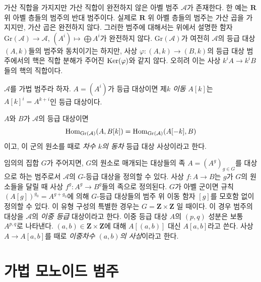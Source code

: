 \begin{remark}[주의]
\label{remark-direct-sums-not-exact}
가산 직합을 가지지만 가산 직합이 완전하지 않은 아벨 범주
$\mathcal{A}$가 존재한다. 한 예는 $\mathbf{R}$ 위 아벨 층들의 범주의
반대 범주이다. 실제로 $\mathbf{R}$ 위 아벨 층들의 범주는 가산 곱을
가지지만, 가산 곱은 완전하지 않다. 그러한 범주에 대해서는 위에서
설명한 함자 $\text{Gr}(\mathcal{A}) \to \mathcal{A}$,
$(A^i) \mapsto \bigoplus A^i$가 완전하지 않다.
$\text{Gr}(\mathcal{A})$가 여전히 $\mathcal{A}$의 등급 대상
$(A, k)$들의 범주와 동치이기는 하지만, 사상
$\varphi : (A, k) \to (B, k)$의 등급 대상 범주에서의 핵은 직합
분해가 주어진 $\mathop{\mathrm{Ker}}(\varphi)$와 같지 않다. 오히려 이는 사상
$k^iA \to k^iB$들의 핵의 직합이다.
\end{remark}

\begin{definition}
\label{definition-graded-shift}
$\mathcal{A}$를 가법 범주라 하자.
$A = (A^i)$가 등급 대상이면 제$k$ {\it 이동} $A[k]$는
$A[k]^i = A^{k + i}$인 등급 대상이다.
\end{definition}

\noindent
$A$와 $B$가 $\mathcal{A}$의 등급 대상이면
\begin{equation}
\label{equation-hom-into-shift}
\mathop{\mathrm{Hom}}\nolimits_{\text{Gr}(\mathcal{A})}(A, B[k]) =
\mathop{\mathrm{Hom}}\nolimits_{\text{Gr}(\mathcal{A})}(A[-k], B)
\end{equation}
이고, 이 군의 원소를 때로 {\it 차수 $k$의 동차} 등급 대상 사상이라고
한다.

\medskip\noindent
임의의 집합 $G$가 주어지면, $G$의 원소로 매개되는 대상들의 족
$A = (A^g)_{g \in G}$를 대상으로 하는 범주로서 $\mathcal{A}$의
$G$-등급 대상을 정의할 수 있다. 사상 $f : A \to B$는 $g$가
$G$의 원소들을 달릴 때 사상 $f^g : A^g \to B^g$들의 족으로 정의된다.
$G$가 아벨 군이면 규칙 $(A[g])^{g_0} = A^{g + g_0}$에 의해
$G$-등급 대상들의 범주 위 이동 함자 $[g]$를 모호함 없이 정의할 수
있다. 이 유형 구성의 특별한 경우는 $G = \mathbf{Z} \times \mathbf{Z}$
일 때이다. 이 경우 범주의 대상을 $\mathcal{A}$의 {\it 이중 등급}
대상이라고 한다. 이중 등급 대상 $A$의 $(p, q)$ 성분은 보통
$A^{p, q}$로 나타낸다. $(a, b) \in \mathbf{Z} \times \mathbf{Z}$에
대해
$A[(a, b)]$ 대신 $A[a, b]$라고 쓴다.
사상 $A \to A[a, b]$를 때로 {\it 이중차수 $(a, b)$의 사상}이라고
한다.







\section{가법 모노이드 범주}
\label{section-monoidal}


